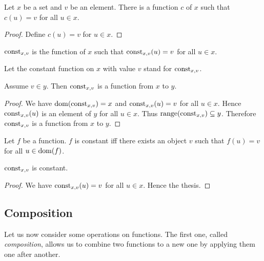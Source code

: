 \documentclass[../../set-theory.tex]{subfiles}
\begin{document}
  \begin{forthel}
    \begin{lemma}
      Let $x$ be a set and $v$ be an element.
      There is a function $c$ of $x$ such that $c(u) = v$ for all $u \in x$.
    \end{lemma}
    \begin{proof}
      Define $c(u) = v$ for $u \in x$.
    \end{proof}

    \begin{definition}
      $\mbox{const}_{x,v}$ is the function of $x$ such that $\mbox{const}_{x,v}(u) = v$ for all $u \in x$.
    \end{definition}

    Let the constant function on $x$ with value $v$ stand for $\mbox{const}_{x,v}$.

    \begin{proposition}\label{SetTheory_02_01_180417}
      Assume $v \in y$.
      Then $\mbox{const}_{x,v}$ is a function from $x$ to $y$.
    \end{proposition}
    \begin{proof}
      We have $\operatorname{dom}(\mbox{const}_{x,v}) = x$ and $\mbox{const}_{x,v}(u) = v$ for all $u \in x$.
      Hence $\mbox{const}_{x,v}(u)$ is an element of $y$ for all $u \in x$.
      Thus $\operatorname{range}(\mbox{const}_{x,v}) \subseteq y$.
      Therefore $\mbox{const}_{x,v}$ is a function from $x$ to $y$.
    \end{proof}

    \begin{definition}
      Let $f$ be a function.
      $f$ is constant iff there exists an object $v$ such that $f(u) = v$ for all $u \in \operatorname{dom}(f)$.
    \end{definition}

    \begin{proposition}\label{SetTheory_02_01_359618}
      $\mbox{const}_{x,v}$ is constant.
    \end{proposition}
    \begin{proof}
      We have $\mbox{const}_{x,v}(u) = v$ for all $u \in x$.
      Hence the thesis.
    \end{proof}
  \end{forthel}


  \subsection{Composition}

  Let us now consider some operations on functions.
  The first one, called \textit{composition}, allows us to combine two functions
  to a new one by applying them one after another.
\end{document}
